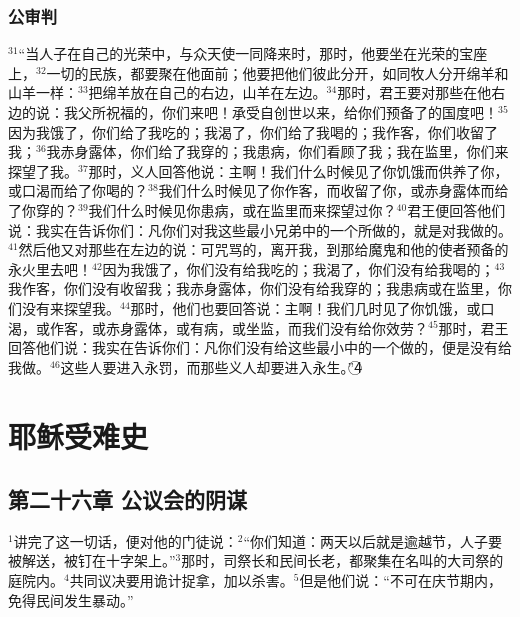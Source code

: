 \subsubsection{公审判}
$^{31}$“当人子在自己的光荣中，与众天使一同降来时，那时，他要坐在光荣的宝座上，$^{32}$一切的民族，都要聚在他面前；他要把他们彼此分开，如同牧人分开绵羊和山羊一样：$^{33}$把绵羊放在自己的右边，山羊在左边。$^{34}$那时，君王要对那些在他右边的说：我父所祝福的，你们来吧！承受自创世以来，给你们预备了的国度吧！$^{35}$因为我饿了，你们给了我吃的；我渴了，你们给了我喝的；我作客，你们收留了我；$^{36}$我赤身露体，你们给了我穿的；我患病，你们看顾了我；我在监里，你们来探望了我。$^{37}$那时，义人回答他说：主啊！我们什么时候见了你饥饿而供养了你，或口渴而给了你喝的？$^{38}$我们什么时候见了你作客，而收留了你，或赤身露体而给了你穿的？$^{39}$我们什么时候见你患病，或在监里而来探望过你？$^{40}$君王便回答他们说：我实在告诉你们：凡你们对我这些最小兄弟中的一个所做的，就是对我做的。$^{41}$然后他又对那些在左边的说：可咒骂的，离开我，到那给魔鬼和他的使者预备的永火里去吧！$^{42}$因为我饿了，你们没有给我吃的；我渴了，你们没有给我喝的；$^{43}$我作客，你们没有收留我；我赤身露体，你们没有给我穿的；我患病或在监里，你们没有来探望我。$^{44}$那时，他们也要回答说：主啊！我们几时见了你饥饿，或口渴，或作客，或赤身露体，或有病，或坐监，而我们没有给你效劳？$^{45}$那时，君王回答他们说：我实在告诉你们：凡你们没有给这些最小中的一个做的，便是没有给我做。$^{46}$这些人要进入永罚，而那些义人却要进入永生。”\textcircled{4}


\section{耶稣受难史}


\subsection{第二十六章 公议会的阴谋}
$^{1}$\UL[耶稣]讲完了这一切话，便对他的门徒说：$^{2}$“你们知道：两天以后就是逾越节，人子要被解送，被钉在十字架上。”$^{3}$那时，司祭长和民间长老，都聚集在名叫\UL[盖法]的大司祭的庭院内。$^{4}$共同议决要用诡计捉拿\UL[耶稣]，加以杀害。$^{5}$但是他们说：“不可在庆节期内，免得民间发生暴动。”


